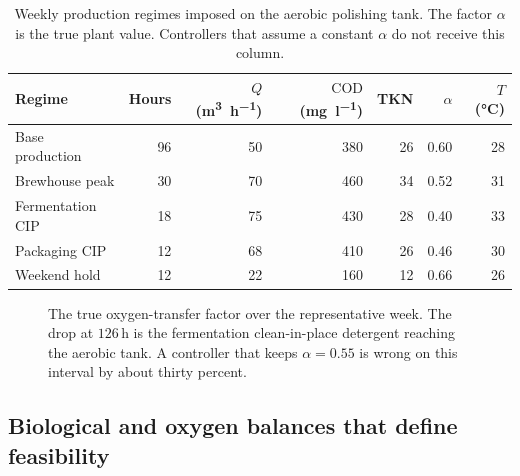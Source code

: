 \begin{table}[ht]
\centering
\caption{Weekly production regimes imposed on the aerobic polishing tank. The factor $\alpha$ is the true plant value. Controllers that assume a constant $\alpha$ do not receive this column.}
\label{tab:regimes}
\begin{tabular}{@{}lrrrrrr@{}}
\toprule
Regime & Hours & $Q$ (\si{\cubic\metre\per\hour}) & $\mathrm{COD}$ (\si{\milli\gram\per\litre}) & TKN & $\alpha$ & $T$ (\si{\celsius}) \\
\midrule
Base production & 96 & 50 & 380 & 26 & 0.60 & 28 \\
Brewhouse peak & 30 & 70 & 460 & 34 & 0.52 & 31 \\
Fermentation CIP & 18 & 75 & 430 & 28 & 0.40 & 33 \\
Packaging CIP & 12 & 68 & 410 & 26 & 0.46 & 30 \\
Weekend hold & 12 & 22 & 160 & 12 & 0.66 & 26 \\
\bottomrule
\end{tabular}
\end{table}

\begin{figure}[ht]
\centering
{}
\caption{The true oxygen-transfer factor over the representative week. The drop at $126\,\mathrm{h}$ is the fermentation clean-in-place detergent reaching the aerobic tank. A controller that keeps $\alpha=0.55$ is wrong on this interval by about thirty percent.}
\label{fig:alpha-week}
\end{figure}

\subsection{Biological and oxygen balances that define feasibility}

